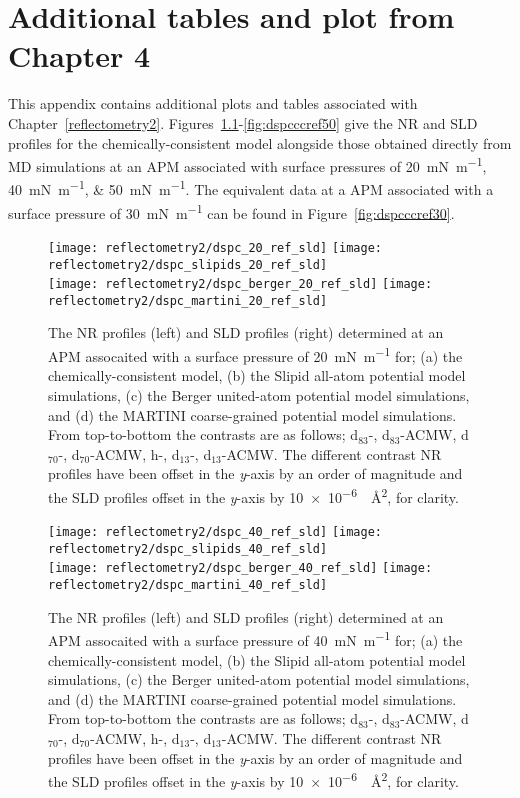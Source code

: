\chapter{Additional tables and plot from Chapter 4}
\label{refl2}
This appendix contains additional plots and tables associated with Chapter~\ref{reflectometry2}.
Figures~\ref{fig:dspcccref20}-\ref{fig:dspcccref50} give the NR and SLD profiles for the chemically-consistent model alongside those obtained directly from MD simulations at an APM associated with surface pressures of \SIlist{20;40;50}{\milli\newton\per\meter}.
The equivalent data at a APM associated with a surface pressure of \SI{30}{\milli\newton\per\meter} can be found in Figure~\ref{fig:dspcccref30}.
%
\begin{figure}
    \centering
    \texttt{[image: reflectometry2/dspc\_20\_ref\_sld]}
    \texttt{[image: reflectometry2/dspc\_slipids\_20\_ref\_sld]}\\
    \texttt{[image: reflectometry2/dspc\_berger\_20\_ref\_sld]}
    \texttt{[image: reflectometry2/dspc\_martini\_20\_ref\_sld]}
    \caption{The NR profiles (left) and SLD profiles (right) determined at an APM assocaited with a surface pressure of \SI{20}{\milli\newton\per\meter} for; (a) the chemically-consistent model, (b) the Slipid all-atom potential model simulations, (c) the Berger united-atom potential model simulations, and (d) the MARTINI coarse-grained potential model simulations. From top-to-bottom the contrasts are as follows; d$_{83}$-, d$_{83}$-ACMW, d$_{70}$-, d$_{70}$-ACMW, h-, d$_{13}$-, d$_{13}$-ACMW. The different contrast NR profiles have been offset in the \emph{y}-axis by an order of magnitude and the SLD profiles offset in the \emph{y}-axis by \SI{10e-6}{\per\angstrom\squared}, for clarity.}
    \label{fig:dspcccref20}
\end{figure}
%
%
\begin{figure}
\forceversofloat
    \centering
    \texttt{[image: reflectometry2/dspc\_40\_ref\_sld]}
    \texttt{[image: reflectometry2/dspc\_slipids\_40\_ref\_sld]}\\
    \texttt{[image: reflectometry2/dspc\_berger\_40\_ref\_sld]}
    \texttt{[image: reflectometry2/dspc\_martini\_40\_ref\_sld]}
    \caption{The NR profiles (left) and SLD profiles (right) determined at an APM assocaited with a surface pressure of \SI{40}{\milli\newton\per\meter} for; (a) the chemically-consistent model, (b) the Slipid all-atom potential model simulations, (c) the Berger united-atom potential model simulations, and (d) the MARTINI coarse-grained potential model simulations. From top-to-bottom the contrasts are as follows; d$_{83}$-, d$_{83}$-ACMW, d$_{70}$-, d$_{70}$-ACMW, h-, d$_{13}$-, d$_{13}$-ACMW. The different contrast NR profiles have been offset in the \emph{y}-axis by an order of magnitude and the SLD profiles offset in the \emph{y}-axis by \SI{10e-6}{\per\angstrom\squared}, for clarity.}
    \label{fig:dspcccref40}
\end{figure}
